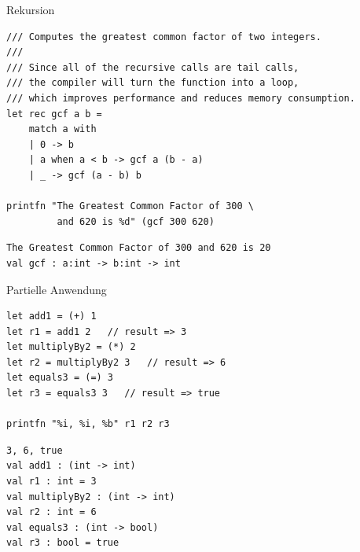 \documentclass[t]{beamer}
\begin{document}
\begin{frame}[label={sec:orgb00eee0},fragile]{Rekursion}
 \begin{verbatim}
/// Computes the greatest common factor of two integers.
///
/// Since all of the recursive calls are tail calls,
/// the compiler will turn the function into a loop,
/// which improves performance and reduces memory consumption.
let rec gcf a b =
    match a with
    | 0 -> b
    | a when a < b -> gcf a (b - a)
    | _ -> gcf (a - b) b

printfn "The Greatest Common Factor of 300 \
         and 620 is %d" (gcf 300 620)
\end{verbatim}

\begin{verbatim}
The Greatest Common Factor of 300 and 620 is 20
val gcf : a:int -> b:int -> int
\end{verbatim}
\end{frame}

\begin{frame}[label={sec:org573caf9},fragile]{Partielle Anwendung}
 \scriptsize

\begin{verbatim}
let add1 = (+) 1        
let r1 = add1 2   // result => 3
let multiplyBy2 = (*) 2
let r2 = multiplyBy2 3   // result => 6
let equals3 = (=) 3
let r3 = equals3 3   // result => true

printfn "%i, %i, %b" r1 r2 r3
\end{verbatim}

\begin{verbatim}
3, 6, true
val add1 : (int -> int)
val r1 : int = 3
val multiplyBy2 : (int -> int)
val r2 : int = 6
val equals3 : (int -> bool)
val r3 : bool = true
\end{verbatim}
\end{frame}
\end{document}
